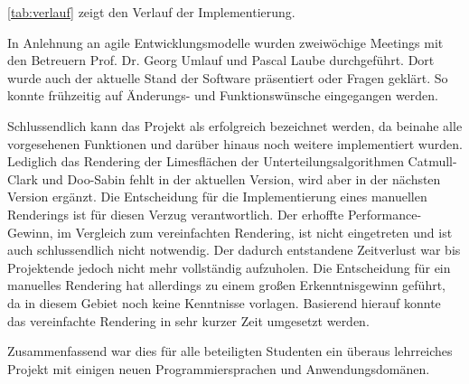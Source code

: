 \autoref{tab:verlauf} zeigt den Verlauf der Implementierung.

In Anlehnung an agile Entwicklungsmodelle wurden zweiwöchige Meetings mit den Betreuern Prof. Dr. Georg Umlauf und Pascal Laube durchgeführt. 
Dort wurde auch der aktuelle Stand der Software präsentiert oder Fragen geklärt.
So konnte frühzeitig auf Änderungs- und Funktionswünsche eingegangen werden.

Schlussendlich kann das Projekt als erfolgreich bezeichnet werden, da beinahe alle vorgesehenen Funktionen und darüber hinaus noch weitere implementiert wurden.
Lediglich das Rendering der Limesflächen der Unterteilungsalgorithmen Catmull-Clark und Doo-Sabin fehlt in der aktuellen Version, wird aber in der nächsten Version ergänzt.
Die Entscheidung für die Implementierung eines manuellen Renderings ist für diesen Verzug verantwortlich.
Der erhoffte Performance-Gewinn, im Vergleich zum vereinfachten Rendering, ist nicht eingetreten und ist auch schlussendlich nicht notwendig.
Der dadurch entstandene Zeitverlust war bis Projektende jedoch nicht mehr vollständig aufzuholen.
Die Entscheidung für ein manuelles Rendering hat allerdings zu einem großen Erkenntnisgewinn geführt, da in diesem Gebiet noch keine Kenntnisse vorlagen.
Basierend hierauf konnte das vereinfachte Rendering in sehr kurzer Zeit umgesetzt werden.

Zusammenfassend war dies für alle beteiligten Studenten ein überaus lehrreiches Projekt mit einigen neuen Programmiersprachen und Anwendungsdomänen.
